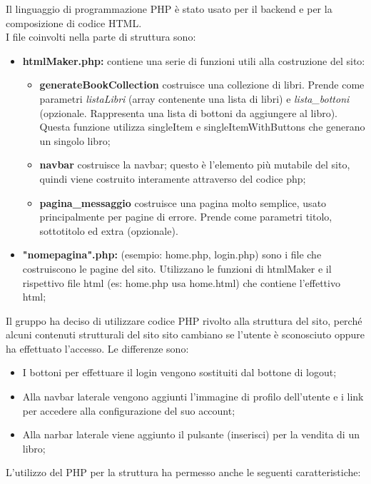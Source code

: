 Il linguaggio di programmazione PHP è stato usato per il backend e per la composizione di codice HTML.\\
I file coinvolti nella parte di struttura sono:
\begin{itemize}
    \item \textbf{htmlMaker.php:} contiene una serie di funzioni utili alla costruzione del sito:\label{htmlmaker}
        \begin{itemize}
            \item \textbf{generateBookCollection} costruisce una collezione di libri. Prende come parametri \textit{listaLibri} (array contenente una lista di libri) e \textit{lista\_bottoni} (opzionale. Rappresenta una lista di bottoni da aggiungere al libro). Questa funzione utilizza singleItem e singleItemWithButtons che generano un singolo libro;
            \item \textbf{navbar} costruisce la navbar; questo è l'elemento più mutabile del sito, quindi viene costruito interamente attraverso del codice php;
            \item \textbf{pagina\_messaggio} costruisce una pagina molto semplice, usato principalmente per pagine di errore. Prende come parametri titolo, sottotitolo ed extra (opzionale).
        \end{itemize}
    \item \textbf{"nomepagina".php:} (esempio: home.php, login.php) sono i file che costruiscono le pagine del sito. Utilizzano le funzioni di htmlMaker e il rispettivo file html (es: home.php usa home.html) che contiene l'effettivo html; 
\end{itemize}
Il gruppo ha deciso di utilizzare codice PHP rivolto alla struttura del sito, perché alcuni contenuti strutturali del sito sito cambiano se l'utente è sconosciuto oppure ha effettuato l'accesso. Le differenze sono:
\begin{itemize}
    \item I bottoni per effettuare il login vengono sostituiti dal bottone di logout;
    \item Alla navbar laterale vengono aggiunti l'immagine di profilo dell'utente e i link per accedere alla configurazione del suo account;
    \item Alla narbar laterale viene aggiunto il pulsante (inserisci) per la vendita di un libro;
\end{itemize}
L'utilizzo del PHP per la struttura ha permesso anche le seguenti caratteristiche:
